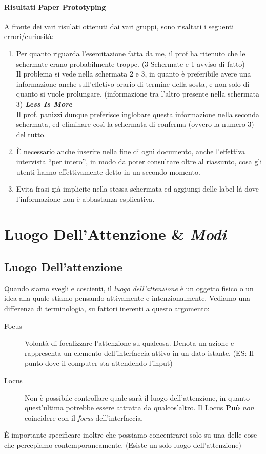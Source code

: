 \documentclass[oneside]{book}
\begin{document}
			\subsubsection{Risultati Paper Prototyping}
				A fronte dei vari risulati ottenuti dai vari gruppi, sono risaltati i seguenti errori/curiosità:\\
				\begin{enumerate}
				\item Per quanto riguarda l'esercitazione fatta da me, il prof ha ritenuto che le schermate erano probabilmente troppe. (3 Schermate e 1 avviso di fatto) \\
				Il problema si vede nella schermata 2 e 3, in quanto è preferibile avere una informazione anche sull'effetivo orario di termine della sosta, e non solo di quanto si vuole prolungare. (informazione tra l'altro presente nella schermata 3) \textbf{\emph{Less Is More}} \\
				Il prof. panizzi dunque preferisce inglobare questa informazione nella seconda schermata, ed eliminare così la schermata di conferma (ovvero la numero 3) del tutto. \\
				\item È necessario anche inserire nella fine di ogni documento, anche l'effettiva intervista ``per intero'', in modo da poter consultare oltre al riassunto, cosa gli utenti hanno effettivamente detto in un secondo momento.
				\item Evita frasi già implicite nella stessa schermata ed aggiungi delle label lá dove l'informazione non è abbastanza esplicativa.
				\end{enumerate}

\chapter{Luogo Dell'Attenzione \& \emph{Modi}}
	\section{Luogo Dell'attenzione} \label{sec:luogoAttenzione}
		Quando siamo svegli e coscienti, il \emph{luogo dell'attenzione} è un oggetto fisico o un idea alla quale stiamo pensando attivamente e intenzionalmente. Vediamo una differenza di terminologia, su fattori inerenti a questo argomento: \\
		\begin{description}
		\item[Focus] Volontà di focalizzare l'attenzione su qualcosa. Denota un azione e rappresenta un elemento dell'interfaccia attivo in un dato istante. (ES: Il punto dove il computer sta attendendo l'input)
		\item[Locus] Non è possibile controllare quale sarà il luogo dell'attenzione, in quanto quest'ultima potrebbe essere attratta da qualcos'altro. Il Locus \textbf{Può} \emph{non} coincidere con il \emph{focus} dell'interfaccia.
		\end{description}
		È importante specificare inoltre che possiamo concentrarci solo su una delle cose che percepiamo contemporaneamente. (Esiste un solo luogo dell'attenzione)
\end{document}
